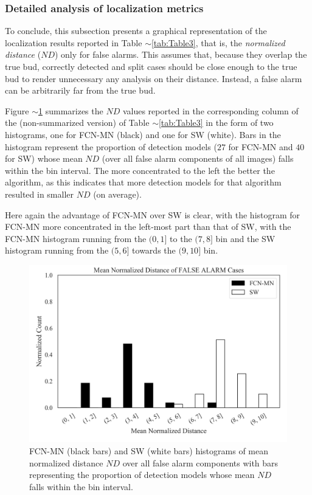 \documentclass[a4paper,authoryear,review]{elsarticle}
\begin{document}
	\subsubsection{Detailed analysis of localization metrics}
	
	To conclude, this subsection presents a graphical representation of the localization results reported in Table $\sim$\ref{tab:Table3}, that is,  the \emph{normalized distance} ($ND$) only for false alarms. This assumes that, because they overlap the true bud, correctly detected and split cases should be close enough to the true bud to render unnecessary any analysis on their distance. Instead, a false alarm can be arbitrarily far from the true bud. 
	
	Figure $\sim$\ref{fig:Figure7} summarizes the $ND$ values reported in the corresponding column of the (non-summarized version) of Table $\sim$\ref{tab:Table3} in the form of two histograms, one for FCN-MN (black) and one for SW (white).  Bars in the histogram represent the proportion of detection models ($27$ for FCN-MN and $40$ for SW) whose mean $ND$ (over all false alarm components of all images) falls within the bin interval. The more concentrated to the left the better the algorithm, as this indicates that more detection models for that algorithm resulted in smaller $ND$ (on average).
	
	Here again the advantage of FCN-MN over SW is clear, with the histogram for FCN-MN more concentrated in the left-most part than that of SW, with the FCN-MN histogram running from the $(0,1]$ to the $(7,8]$ bin and the SW histogram running from the $(5,6]$ towards the $(9,10]$ bin. 
	
	\begin{figure}%
		\centering
		\includegraphics[width=\textwidth]{figures/AAA_normalized_distance_falsealarm_fcn_sw.png}%
		\caption{
			FCN-MN (black bars) and SW (white bars) histograms of mean normalized distance $ND$ over all false alarm components with bars representing the proportion of detection models whose mean $ND$ falls within the bin interval.
		}
		\label{fig:Figure7}
	\end{figure}
	
\end{document}
